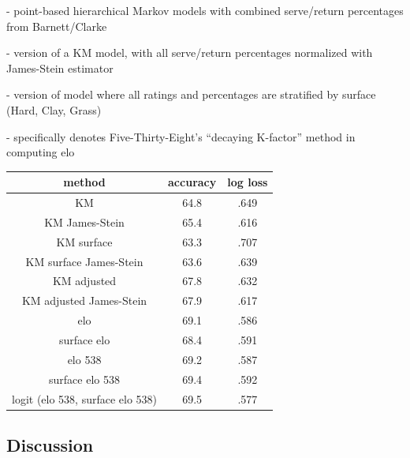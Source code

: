 \documentclass[chapterprefix=false]{report}
\begin{document}
\begin{description}[leftmargin=2.5cm, labelindent=2.5cm]
\item[KM] - point-based hierarchical Markov models with combined serve/return percentages from Barnett/Clarke

\item[James-Stein] - version of a KM model, with all serve/return percentages normalized with James-Stein estimator

\item[surface] - version of model where all ratings and percentages are stratified by surface (Hard, Clay, Grass)

\item[538] - specifically denotes Five-Thirty-Eight's ``decaying K-factor'' method in computing elo
\end{description}

\begin{center}
\begin{tabular}{ |c|c|c| } 
 \hline
 method & accuracy & log loss
   \\ 
 \hline
  KM & 64.8 & .649
  \\ 
 \hline
  KM James-Stein & 65.4 & .616
  \\ 
 \hline
 KM surface & 63.3 & .707
  \\ 
 \hline
 KM surface James-Stein & 63.6 & .639
  \\ 
 \hline
 KM adjusted & 67.8 & .632
  \\ 
 \hline
 KM adjusted James-Stein & 67.9 & .617
  \\ 
 \hline
  elo & 69.1 & .586
  \\ 
 \hline
 surface elo & 68.4 & .591
  \\ 
 \hline
 elo 538 & 69.2 & .587
  \\ 
 \hline
 surface elo 538 & 69.4 & .592
  \\ 
 \hline
 logit (elo 538, surface elo 538) & 69.5 & .577
  \\ 
 \hline
\end{tabular}
\end{center}

\subsection{Discussion}
\end{document}
